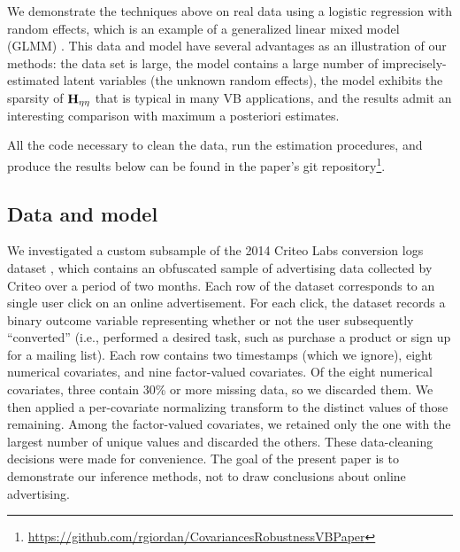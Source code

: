 \documentclass{article}\usepackage[]{graphicx}\usepackage[]{color}
\theoremstyle{plain}
\theoremstyle{definition}
\theoremstyle{plain}
\theoremstyle{plain}
\theoremstyle{plain}
\theoremstyle{plain}
\begin{document}
\newcommand{\glmmDimension}{5}
\newcommand{\glmmNumGroups}{5000}
\newcommand{\glmmNumObs}{61895}
\newcommand{\glmmHessDim}{10014}
\newcommand{\glmmInverseTime}{173}
\newcommand{\glmmHessianTime}{323}
\newcommand{\glmmVBTime}{57}
\newcommand{\glmmMCMCTime}{21066}
\newcommand{\glmmMCMCTimeMinutes}{351}
\newcommand{\glmmCGRowTime}{9.4}
\newcommand{\glmmCGRowIters}{81}
\newcommand{\glmmCGBetaTime}{46.9}
\newcommand{\glmmMAPTime}{12}
\newcommand{\glmmGLMERTime}{104}
\newcommand{\glmmVBRefitTime}{27.2}
\newcommand{\glmmSpeedup}{370}
\newcommand{\glmmNumMCMCDraws}{5000}
\newcommand{\glmmNumGHPoints}{4}
\newcommand{\glmmBetaInfoDiag}{0.100}
\newcommand{\glmmBetaLoc}{0.000}
\newcommand{\glmmMuLoc}{0.000}
\newcommand{\glmmMuInfo}{0.010}
\newcommand{\glmmTauAlpha}{3.000}
\newcommand{\glmmTauBeta}{3.000}


We demonstrate the techniques above on real data using a logistic
regression with random effects, which is an example of a generalized
linear mixed model (GLMM) \citep[chapter 13]{agresti:2011:categorical}.
This data and model have several advantages as an illustration of
our methods: the data set is large, the model contains a large number
of imprecisely-estimated latent variables (the unknown random effects),
the model exhibits the sparsity of $\mathbf{H}_{\eta\eta}$ that is typical in many
VB applications, and the results admit an interesting comparison with
maximum a posteriori estimates.

All the code necessary to clean the data, run the estimation procedures,
and produce the results below can be found in the paper's git repository\footnote{\url{https://github.com/rgiordan/CovariancesRobustnessVBPaper}}.

\subsection{Data and model\label{subsec:glmm_model}}

We investigated a custom subsample of the 2014 Criteo Labs conversion
logs dataset \citep{criteo:2014:dataset}, which contains an obfuscated
sample of advertising data collected by Criteo over a period of two
months. Each row of the dataset corresponds to an single user click
on an online advertisement. For each click, the dataset records a
binary outcome variable representing whether or not the user subsequently
``converted'' (i.e., performed a desired task, such as purchase
a product or sign up for a mailing list). Each row contains two timestamps
(which we ignore), eight numerical covariates, and nine factor-valued
covariates. Of the eight numerical covariates, three contain 30\%
or more missing data, so we discarded them. We then applied a per-covariate
normalizing transform to the distinct values of those remaining. Among
the factor-valued covariates, we retained only the one with the largest
number of unique values and discarded the others. These data-cleaning
decisions were made for convenience. The goal of the present paper
is to demonstrate our inference methods, not to draw conclusions about
online advertising.
\end{document}
